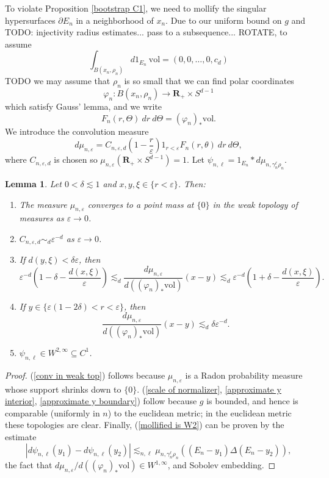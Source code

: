 \documentclass[reqno,12pt,letterpaper]{amsart}
\newcommand{\RR}{\mathbf{R}}
\newcommand{\vol}{\mathrm{vol}}
\newtheorem{lemma}[theorem]{Lemma}
\theoremstyle{definition}
\numberwithin{equation}{section}
\begin{document}
To violate Proposition \ref{bootstrap C1}, we need to mollify the singular hypersurfaces $\partial E_n$ in a neighborhood of $x_n$.
Due to our uniform bound on $g$ and TODO: injectivity radius estimates... pass to a subsequence... ROTATE, to assume
$$\int_{B(x_n, \rho_n)} d1_{E_n}~\vol = (0, 0, \dots, 0, c_d)$$
TODO we may assume that $\rho_n$ is so small that we can find polar coordinates
$$\varphi_n: B(x_n, \rho_n) \to \RR_+ \times S^{d - 1}$$
which satisfy Gauss' lemma, and we write
$$F_n(r, \Theta) ~dr ~d\Theta = (\varphi_n)_* \vol.$$
We introduce the convolution measure
$$d\mu_{n, \varepsilon} = C_{n, \varepsilon, d} \left(1 - \frac{r}{\varepsilon}\right)1_{r < \varepsilon} F_n(r, \theta) ~dr ~d\Theta,$$
where $C_{n, \varepsilon, d}$ is chosen so $\mu_{n, \varepsilon}(\RR_+ \times S^{d - 1}) = 1$.
Let $\psi_{n, \ell} = 1_{E_n} * d\mu_{n, \gamma_n^\ell \rho_n}$.

\begin{lemma}\label{mollify props}
Let $0 < \delta \lesssim 1$ and $x, y, \xi \in \{r < \varepsilon\}$. Then:
\begin{enumerate}
\item \label{conv in weak top} The measure $\mu_{n, \varepsilon}$ converges to a point mass at $\{0\}$ in the weak topology of measures as $\varepsilon \to 0$.
\item \label{scale of normalizer} $C_{n, \varepsilon, d} \sim_d \varepsilon^{-d}$ as $\varepsilon \to 0$.
\item \label{approximate y interior} If $d(y, \xi) < \delta\varepsilon$, then
$$\varepsilon^{-d}\left(1 - \delta - \frac{d(x, \xi)}{\varepsilon}\right) \lesssim_d \frac{d\mu_{n, \varepsilon}}{d((\varphi_n)_* \vol)}(x - y) \lesssim_d \varepsilon^{-d}\left(1 + \delta - \frac{d(x, \xi)}{\varepsilon}\right).$$
\item \label{approximate y boundary} If $y \in \{\varepsilon(1 - 2\delta) < r < \varepsilon\}$, then
$$\frac{d\mu_{n, \varepsilon}}{d((\varphi_n)_*\vol)}(x - y) \lesssim_d \delta \varepsilon^{-d}.$$
\item \label{mollified is W2} $\psi_{n, \ell} \in W^{2, \infty} \subseteq C^1$.
\end{enumerate}
\end{lemma}
\begin{proof}
(\ref{conv in weak top}) follows because $\mu_{n, \varepsilon}$ is a Radon probability measure whose support shrinks down to $\{0\}$.
(\ref{scale of normalizer}, \ref{approximate y interior}, \ref{approximate y boundary}) follow because $g$ is bounded, and hence is comparable (uniformly in $n$) to the euclidean metric; in the euclidean metric these topologies are clear.
Finally, (\ref{mollified is W2}) can be proven by the estimate
$$|d\psi_{n, \ell}(y_1) - d\psi_{n, \ell}(y_2)| \lesssim_{n, \ell} \mu_{n, \gamma_n^\ell \rho_n}((E_n - y_1) \Delta (E_n - y_2)),$$
the fact that $d\mu_{n, \varepsilon}/d((\varphi_n)_*\vol) \in W^{1, \infty}$, and Sobolev embedding.
\end{proof}
\end{document}
